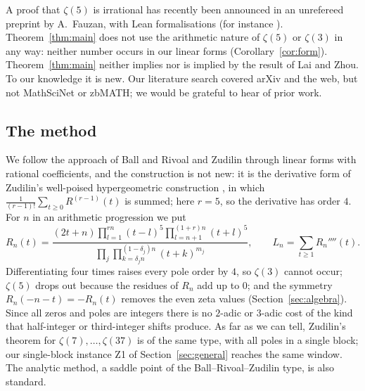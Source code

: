 \documentclass[11pt]{amsart}
\theoremstyle{definition}
\theoremstyle{remark}
\numberwithin{equation}{section}
\begin{document}
A proof that $\zeta(5)$ is irrational has recently been announced in an unrefereed preprint by A.~Fauzan, with
Lean formalisations (for instance \cite{zeta5}). Theorem~\ref{thm:main} does not use the arithmetic nature of
$\zeta(5)$ or $\zeta(3)$ in any way: neither number occurs in our linear forms (Corollary~\ref{cor:form}).
Theorem~\ref{thm:main} neither implies nor is implied by the result of Lai and Zhou. To our knowledge it is new.
Our literature search covered arXiv and the web, but not MathSciNet or zbMATH; we would be grateful to hear of
prior work.

\subsection{The method}
We follow the approach of Ball and Rivoal \cite{BallRivoal2001} and Zudilin \cite{Zudilin2002,Zudilin2004}
through linear forms with rational coefficients, and the construction is not new: it is the derivative form of
Zudilin's well-poised hypergeometric construction \cite[\S8, (8.2)--(8.4)]{Zudilin2004}, in which
$\frac1{(r-1)!}\sum_{t\ge0}R^{(r-1)}(t)$ is summed; here $r=5$, so the derivative has order $4$. For $n$ in an arithmetic progression we put
\[
  R_n(t)=\frac{(2t+n)\prod_{l=1}^{rn}(t-l)^5\prod_{l=n+1}^{(1+r)n}(t+l)^5}{\prod_{j}\prod_{k=\delta_jn}^{(1-\delta_j)n}(t+k)^{m_j}},
  \qquad L_n=\sum_{t\ge1}R_n''''(t).
\]
Differentiating four times raises every pole order by $4$, so $\zeta(3)$ cannot occur; $\zeta(5)$ drops out
because the residues of $R_n$ add up to $0$; and the symmetry $R_n(-n-t)=-R_n(t)$ removes the even zeta values
(Section~\ref{sec:algebra}). Since all zeros and poles are integers there is no $2$-adic or $3$-adic cost of the
kind that half-integer or third-integer shifts produce. As far as we can tell, Zudilin's theorem for
$\zeta(7),\dots,\zeta(37)$ is of the same type, with all poles in a single block; our single-block instance Z1 of
Section~\ref{sec:general} reaches the same window. The analytic method, a saddle point of the Ball--Rivoal--Zudilin type, is also standard.
\end{document}
